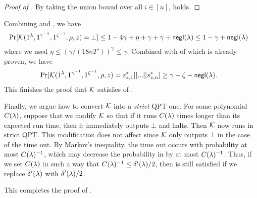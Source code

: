 \begin{proof}[Proof of ]
By taking the union bound over all $i\in [n]$,  holds.

\end{proof}

Combining  and , we have 
\begin{align*}
\Pr[\mathcal{K}(1^\lambda,1^{\gamma^{-1}},1^{\zeta^{-1}},\rho,z)=\bot]\le 1-4\gamma+ \eta+ \gamma + \gamma+\mathsf{negl}(\lambda)\le 1-\gamma+\mathsf{negl}(\lambda)
\end{align*}
where we used $\eta \le \left( \gamma/(18nT')\right)^2\le \gamma$. 
Combined with  of  which is already proven, we have 
\begin{align*}
\Pr[\mathcal{K}(1^\lambda,1^{\gamma^{-1}},1^{\zeta^{-1}},\rho,z)=s_{z,1}^*||...||s_{z,n}^*]\ge \gamma-\zeta-\mathsf{negl}(\lambda). 
\end{align*} 
This finishes the proof that $\mathcal{K}$ satisfies   of .


 Finally, we argue how to convert $\mathcal{K}$ into a \emph{strict} QPT one. 
For some polynomial $C(\lambda)$, 
suppose that we modify $\mathcal{K}$ so that if it runs $C(\lambda)$ times longer 
than its expected run time, then it immediately outputs $\bot$ and halts. 
Then $\mathcal{K}$ now runs in strict QPT. This modification does not affect  since $\mathcal{K}$ only outputs $\bot$ in the case of the time out. 
By Markov's inequality, the time out occurs with probability at most $C(\lambda)^{-1}$, which may decrease the probability in  by at most $C(\lambda)^{-1}$. Thus, if we set $C(\lambda)$ in such a way that $C(\lambda)^{-1}\le \delta'(\lambda)/2$, then   is still satisfied if we replace $\delta'(\lambda)$ with $\delta'(\lambda)/2$.  

This completes the proof of . 
 

